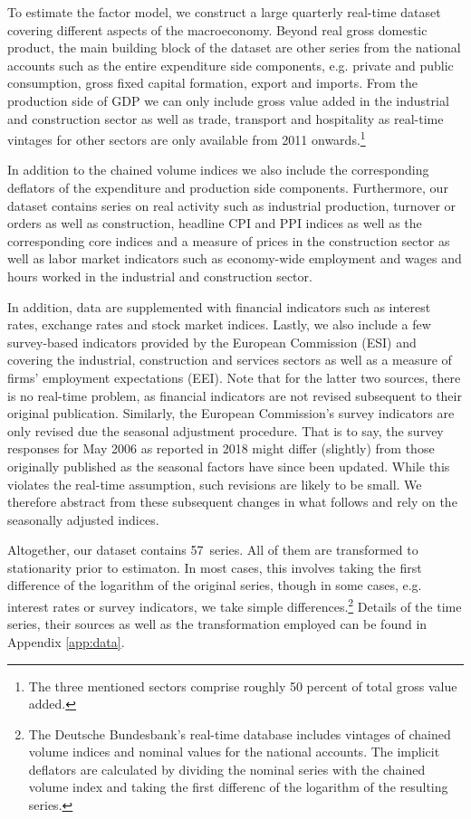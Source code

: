 \documentclass[notitlepage,a4paper,12pt]{article}
\newcommand\NumSeries{57}
\begin{document}
To estimate the factor model, we construct a large quarterly real-time dataset covering different aspects of the macroeconomy. Beyond real gross domestic product, the main building block of the dataset are other series from the national accounts such as the entire expenditure side components, e.g. private and public consumption, gross fixed capital formation, export and imports. From the production side of GDP we can only include gross value added in the industrial and construction sector as well as trade, transport and hospitality as real-time vintages for other sectors are only available from 2011 onwards.\footnote{The three mentioned sectors comprise roughly 50 percent of total gross value added.} 

In addition to the chained volume indices we also include the corresponding deflators of the expenditure and production side components. Furthermore, our dataset contains series on real activity such as industrial production, turnover or orders as well as construction, headline CPI and PPI indices as well as the corresponding core indices and a measure of prices in the construction sector as well as labor market indicators such as economy-wide employment and wages and hours worked in the industrial and construction sector.    

In addition, data are supplemented with financial indicators such as interest rates, exchange rates and stock market indices. Lastly, we also include a few survey-based indicators provided by the European Commission (ESI) and covering the industrial, construction and services sectors as well as a measure of firms' employment expectations (EEI). Note that for the latter two sources, there is no real-time problem, as financial indicators are not revised subsequent to their original publication. Similarly, the European Commission's survey indicators are only revised due the seasonal adjustment procedure. That is to say, the survey responses for May 2006 as reported in 2018 might differ (slightly) from those originally published as the seasonal factors have since been updated. While this violates the real-time assumption, such revisions are likely to be small. We therefore abstract from these subsequent changes in what follows  and rely on the seasonally adjusted indices.

Altogether, our dataset contains \NumSeries\ series. All of them are transformed to stationarity prior to estimaton. In most cases, this involves taking the first difference of the logarithm of the original series, though in some cases, e.g. interest rates or survey indicators, we take simple differences.\footnote{The Deutsche Bundesbank's real-time database includes vintages of chained volume indices and nominal values for the national accounts. The implicit deflators are calculated by dividing the nominal series with the chained volume index and taking the first differenc of the logarithm of the resulting series.} Details of the time series, their sources as well as the transformation employed  can be found in Appendix \ref{app:data}.
\end{document}

